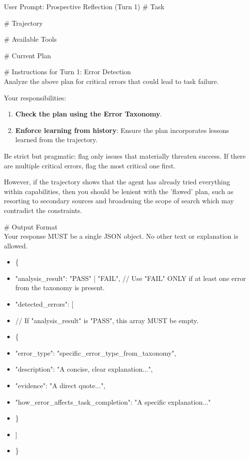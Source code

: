 \begin{UserPromptBox}{User Prompt: Prospective Reflection (Turn 1)}
\# Task\\

\smallskip
\# Trajectory\\

\smallskip
\# Available Tools\\

\smallskip
\# Current Plan\\

\smallskip
\# Instructions for Turn 1: Error Detection\\
Analyze the above plan for critical errors that could lead to task failure.

\smallskip
Your responsibilities:
\begin{enumerate}[leftmargin=*, nosep]
    \item \textbf{Check the plan using the Error Taxonomy}.
    \item \textbf{Enforce learning from history}: Ensure the plan incorporates lessons learned from the trajectory.
\end{enumerate}

\smallskip
Be strict but pragmatic: flag only issues that materially threaten success. If there are multiple critical errors, flag the most critical one first.

\smallskip
However, if the trajectory shows that the agent has already tried everything within capabilities, then you should be lenient with the 'flawed' plan, such as resorting to secondary sources and broadening the scope of search which may contradict the constraints.

\smallskip
\# Output Format\\
Your response MUST be a single JSON object. No other text or explanation is allowed.

\smallskip
\begin{itemize}[label={}, leftmargin=1em]
\item \{
\item \quad "analysis\_result": "PASS" | "FAIL",  // Use "FAIL" ONLY if at least one error from the taxonomy is present.
\item \quad "detected\_errors": [
\item \quad \quad // If "analysis\_result" is "PASS", this array MUST be empty.
\item \quad \quad \{
\item \quad \quad \quad "error\_type": "specific\_error\_type\_from\_taxonomy",
\item \quad \quad \quad "description": "A concise, clear explanation...",
\item \quad \quad \quad "evidence": "A direct quote...",
\item \quad \quad \quad "how\_error\_affects\_task\_completion": "A specific explanation..."
\item \quad \quad \}
\item \quad ]
\item \}
\end{itemize}
\end{UserPromptBox}

